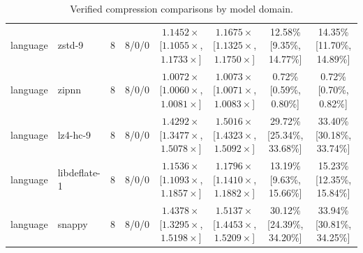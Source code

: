 \begin{table}[t]
{\begin{tabular}{llrccccc}
language & zstd-9 & 8 & 8/0/0 & $1.1452\times$ [$1.1055\times$, $1.1733\times$] & $1.1675\times$ [$1.1325\times$, $1.1750\times$] & 12.58\% [9.35\%, 14.77\%] & 14.35\% [11.70\%, 14.89\%] \\
language & zipnn & 8 & 8/0/0 & $1.0072\times$ [$1.0060\times$, $1.0081\times$] & $1.0073\times$ [$1.0071\times$, $1.0083\times$] & 0.72\% [0.59\%, 0.80\%] & 0.72\% [0.70\%, 0.82\%] \\
language & lz4-hc-9 & 8 & 8/0/0 & $1.4292\times$ [$1.3477\times$, $1.5078\times$] & $1.5016\times$ [$1.4323\times$, $1.5092\times$] & 29.72\% [25.34\%, 33.68\%] & 33.40\% [30.18\%, 33.74\%] \\
language & libdeflate-1 & 8 & 8/0/0 & $1.1536\times$ [$1.1093\times$, $1.1857\times$] & $1.1796\times$ [$1.1410\times$, $1.1882\times$] & 13.19\% [9.63\%, 15.66\%] & 15.23\% [12.35\%, 15.84\%] \\
language & snappy & 8 & 8/0/0 & $1.4378\times$ [$1.3295\times$, $1.5198\times$] & $1.5137\times$ [$1.4453\times$, $1.5209\times$] & 30.12\% [24.39\%, 34.20\%] & 33.94\% [30.81\%, 34.25\%] \\
\hline
\end{tabular}
}
\caption{Verified compression comparisons by model domain.}
\label{tab:verified-compression-domain}
\end{table}

